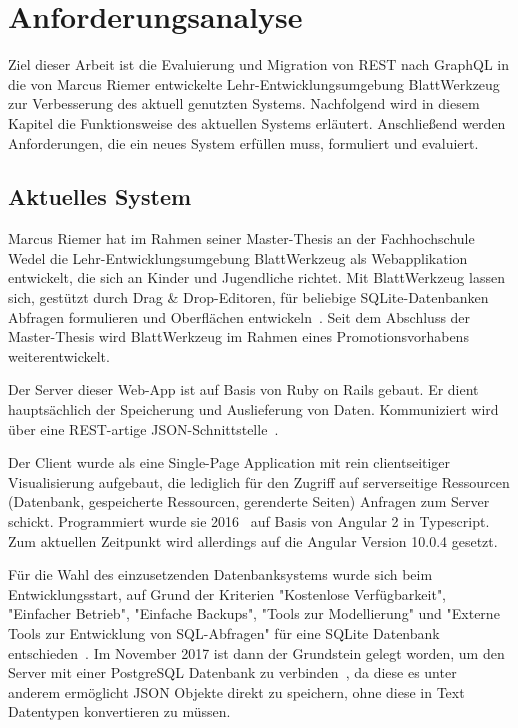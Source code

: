 
\chapter{Anforderungsanalyse}
\label{sec:requirements}

Ziel dieser Arbeit ist die Evaluierung und Migration von REST nach GraphQL in die von Marcus Riemer entwickelte Lehr-Entwicklungsumgebung BlattWerkzeug zur Verbesserung des aktuell genutzten Systems.
Nachfolgend wird in diesem Kapitel die Funktionsweise des aktuellen Systems erläutert. 
Anschließend werden Anforderungen, die ein neues System erfüllen muss, formuliert und evaluiert.

\section{Aktuelles System}
\label{sec:requirements:system}

Marcus Riemer hat im Rahmen seiner Master-Thesis an der Fachhochschule Wedel die Lehr-Entwicklungsumgebung BlattWerkzeug als Webapplikation entwickelt,
die sich an Kinder und Jugendliche richtet. Mit BlattWerkzeug lassen sich, gestützt durch Drag \& Drop-Edi\-toren,
für beliebige SQLite-Datenbanken Abfragen formulieren und Oberflächen entwickeln~\cite[2]{riemer2016}.
Seit dem Abschluss der Master-Thesis wird BlattWerkzeug im Rahmen eines Promotionsvorhabens weiterentwickelt.

Der Server dieser Web-App ist auf Basis von Ruby on Rails gebaut. Er dient hauptsächlich der Speicherung und Auslieferung von Daten.
Kommuniziert wird über eine REST-artige JSON-Schnittstelle~\cite[94]{riemer2016}.

Der Client wurde als eine Single-Page Application mit rein clientseitiger Visualisierung aufgebaut,
die lediglich für den Zugriff auf serverseitige Ressourcen  (Datenbank, gespeicherte Ressourcen, gerenderte Seiten) Anfragen zum Server schickt.
Programmiert wurde sie 2016~\cite[1]{riemer2016} auf Basis von Angular 2 in Typescript.
Zum aktuellen Zeitpunkt wird allerdings auf die Angular Version 10.0.4 gesetzt.

Für die Wahl des einzusetzenden Datenbanksystems wurde sich beim Entwicklungsstart, auf Grund der Kriterien "Kostenlose Verfügbarkeit",
"Einfacher Betrieb", "Einfache Backups", "Tools zur Modellierung" und "Externe Tools zur Entwicklung von SQL-Abfragen"
für eine SQLite Datenbank entschieden~\cite[99-100]{riemer2016}. Im November 2017 ist dann der Grundstein gelegt worden,
um den Server mit einer PostgreSQL Datenbank zu verbinden~\cite{riemerPostgresCommit}, da diese es unter anderem ermöglicht JSON Objekte direkt zu speichern,
ohne diese in Text Datentypen konvertieren zu müssen.

